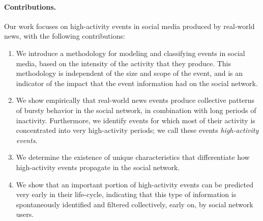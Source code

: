 \paragraph{Contributions.} Our work focuses on high-activity events in social
media produced by real-world news, with the following contributions:
\begin{enumerate}

\item We introduce a methodology for modeling and classifying events in social
media, based on the intensity of the activity that they produce. 
%
This methodology is independent of the size and scope of the event, and is an
indicator of the impact that the event information had on the social network.

\item We show empirically that real-world news events produce collective
patterns of bursty behavior in the social network, in combination with long periods of
inactivity. 
%
Furthermore, we identify events for which most of their activity is concentrated
into very high-activity periods; we call these events {\em high-activity
events}.

\item We determine the existence of unique characteristics that differentiate
how high-activity events propagate in the social network.

\item We show that an important portion of high-activity events can be predicted
very early in their life-cycle, indicating that this type of information is
spontaneously identified and filtered collectively, early on, by social network
users.

\end{enumerate}

